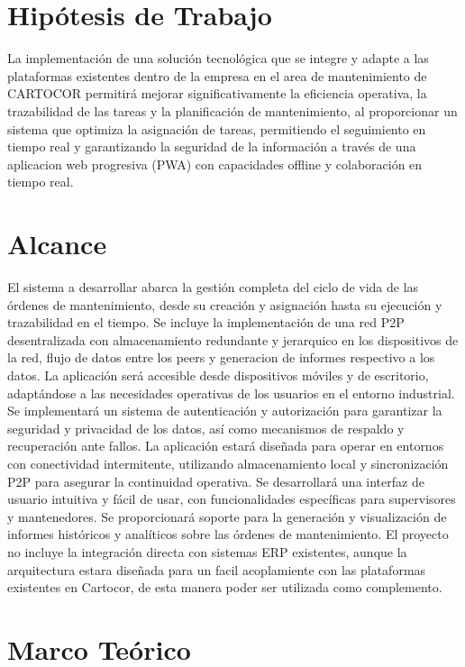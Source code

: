 \documentclass[12pt,a4paper]{report}
\begin{document}
\chapter*{Hipótesis de Trabajo}
La implementación de una solución tecnológica que se integre y adapte a las plataformas existentes dentro de la empresa en el area de mantenimiento de CARTOCOR permitirá mejorar significativamente la eficiencia operativa, la trazabilidad de las tareas y la planificación de mantenimiento, al proporcionar un sistema que optimiza la asignación de tareas, permitiendo el seguimiento en tiempo real y garantizando la seguridad de la información a través de una aplicacion web progresiva (PWA) con capacidades offline y colaboración en tiempo real.


\chapter*{Alcance}
El sistema a desarrollar abarca la gestión completa del ciclo de vida de las órdenes de mantenimiento, desde su creación y asignación hasta su ejecución y trazabilidad en el tiempo. Se incluye la implementación de una red P2P desentralizada con almacenamiento redundante y jerarquico en los dispositivos de la red, flujo de datos entre los peers y generacion de informes respectivo a los datos. La aplicación será accesible desde dispositivos móviles y de escritorio, adaptándose a las necesidades operativas de los usuarios en el entorno industrial. Se implementará un sistema de autenticación y autorización para garantizar la seguridad y privacidad de los datos, así como mecanismos de respaldo y recuperación ante fallos.  La aplicación estará diseñada para operar en entornos con conectividad intermitente, utilizando almacenamiento local y sincronización P2P para asegurar la continuidad operativa. Se desarrollará una interfaz de usuario intuitiva y fácil de usar, con funcionalidades específicas para supervisores y mantenedores. Se proporcionará soporte para la generación y visualización de informes históricos y analíticos sobre las órdenes de mantenimiento.
\newline
El proyecto no incluye la integración directa con sistemas ERP existentes, aunque la arquitectura estara diseñada para un facil acoplamiente con las plataformas existentes en Cartocor, de esta manera poder ser utilizada como complemento.

\chapter*{Marco Teórico}
\end{document}
